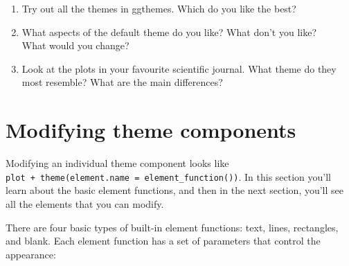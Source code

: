 \begin{enumerate}
\def\labelenumi{\arabic{enumi}.}
\item
  Try out all the themes in ggthemes. Which do you like the best?
\item
  What aspects of the default theme do you like? What don't you like?\\
  What would you change?
\item
  Look at the plots in your favourite scientific journal. What theme do
  they most resemble? What are the main differences?
\end{enumerate}

\section{Modifying theme components}

Modifying an individual theme component looks like
\texttt{plot\ +\ theme(element.name\ =\ element\_function())}. In this
section you'll learn about the basic element functions, and then in the
next section, you'll see all the elements that you can modify.

There are four basic types of built-in element functions: text, lines,
rectangles, and blank. Each element function has a set of parameters
that control the appearance:

